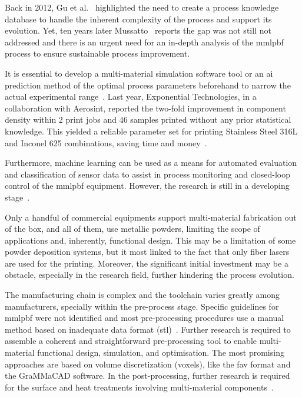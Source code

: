 Back in 2012, Gu et al.~\cite{gu2012laser} highlighted the need to create a
process knowledge database to handle the inherent complexity of the process and
support its evolution. Yet, ten years later Mussatto~\cite{mussatto2022research}
reports the gap was not still not addressed and there is an urgent need for an
in-depth analysis of the \gls{mmlpbf} process to ensure sustainable process improvement. 

It is essential to develop a multi-material simulation
software tool or an \gls{ai} prediction method of the optimal process parameters
beforehand to narrow the actual experimental range~\cite{wei2020overview}.
Last year, Exponential Technologies, in a collaboration with Aerosint, reported
the two-fold improvement in component density within 2 print jobs and 46 samples
printed without any prior statistical knowledge. This yielded a reliable
parameter set for printing Stainless Steel 316L and Inconel 625 combinations,
saving time and money~\cite{xtSAAM2022AI}.

Furthermore, machine learning can be used as a means for automated evaluation
and classification of sensor data to assist in process monitoring and
closed-loop control of the \gls{mmlpbf} equipment. However, the research is
still in a developing stage~\cite{mccann2021situ, yadav2020situ}.

Only a handful of commercial equipments support multi-material fabrication out
of the box, and all of them, use metallic powders, limiting the scope of
applications and, inherently, functional design. This may be a limitation of
some powder deposition systems, but it most linked to the fact that only fiber
lasers are used for the printing. Moreover, the significant initial investment
may be a obstacle, especially in the research field, further hindering the
process evolution.

The manufacturing chain is complex and the toolchain varies greatly among
manufacturers, specially within the pre-process stage.
Specific guidelines for \gls{mmlpbf} were not identified and most pre-processing
procedures use a manual method based on inadequate data format (\gls{stl})~\cite{schneck2021review}.
Further research is
required to assemble a coherent and straightforward pre-processing tool to
enable multi-material functional design, simulation, and optimisation. The most
promising approaches are based on volume discretization (voxels), like the
\gls{fav} format and the GraMMaCAD software. In the post-processing, further
research is required for the surface and heat treatments involving
multi-material components~\cite{schneck2021review}.

